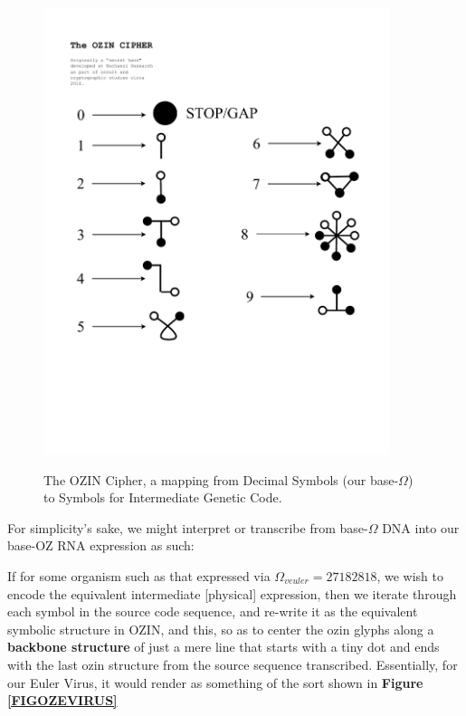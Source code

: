 \documentclass[a4paper, 18pt]{book} %
\begin{document}
\begin{figure}[H]
  \begin{center}
   \includegraphics[trim=0cm 6cm 0cm 0cm, clip, width=0.9\textwidth,]{resources/pdfs/OZINCIPHER.pdf}\\
   \caption{The OZIN Cipher\cite{lutalo_2025_ozin}, a mapping from Decimal Symbols (our base-$\Omega$) to Symbols for Intermediate Genetic Code.}
  \label{FIGOZIN}
  \end{center}
\end{figure}


For simplicity's sake, we might interpret or transcribe from base-$\Omega$ DNA into our base-OZ RNA expression as such:

If for some organism such as that expressed via $\Omega_{veuler} = 27182818$, we wish to encode the equivalent intermediate [physical] expression, then we iterate through each symbol in the source code sequence, and re-write it as the equivalent symbolic structure in OZIN, and this, so as to center the ozin glyphs along a \textbf{backbone structure} of just a mere line that starts with a tiny dot and ends with the last ozin structure from the source sequence transcribed. Essentially, for our Euler Virus, it would render as something of the sort shown in \textbf{Figure \ref{FIGOZEVIRUS}}
\end{document}
